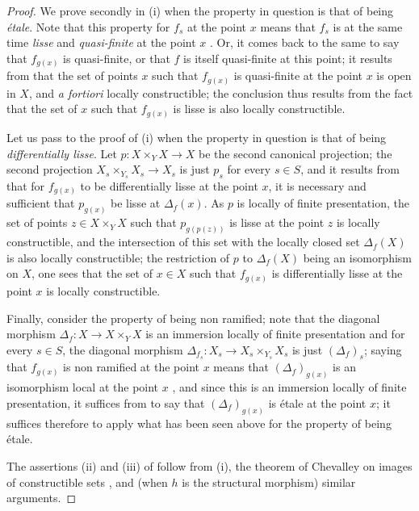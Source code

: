 \begin{proof}

We prove secondly in (i) when the property in question is that of being \emph{\'etale}.
Note that this property for $f_s$ at the point $x$ means that $f_s$ is at the same time \emph{lisse} and \emph{quasi-finite} at the point $x$ .
Or, it comes back to the same to say that $f_{g(x)}$ is quasi-finite, or that $f$ is itself quasi-finite at this point; it results from  that the set of points $x$ such that $f_{g(x)}$ is quasi-finite at the point $x$ is open in $X$, and \emph{a fortiori} locally constructible; the conclusion thus results from the fact that the set of $x$ such that $f_{g(x)}$ is lisse is also locally constructible.

Let us pass to the proof of (i) when the property in question is that of being \emph{differentially lisse}.
Let $p:X\times_Y X\to X$ be the second canonical projection; the second projection $X_s\times_{Y_s}X_s\to X_s$ is just $p_s$ for every $s\in S$, and it results from  that for $f_{g(x)}$ to be differentially lisse at the point $x$, it is necessary and sufficient that $p_{g(x)}$ be lisse at $\Delta_f(x)$.
As $p$ is locally of finite presentation, the set of points $z\in X\times_Y X$ such that $p_{g(p(z))}$ is lisse at the point $z$ is locally constructible, and the intersection of this set with the locally closed set $\Delta_f(X)$ is also locally constructible; the restriction of $p$ to $\Delta_f(X)$ being an isomorphism on $X$, one sees that the set of $x\in X$ such that $f_{g(x)}$ is differentially lisse at the point $x$ is locally constructible.

Finally, consider the property of being non ramified; note that the diagonal morphism $\Delta_f:X\to X\times_Y X$ is an immersion locally of finite presentation  and for every $s\in S$, the diagonal morphism $\Delta_{f_s}:X_s\to X_s\times_{Y_s}X_s$ is just $(\Delta_f)_s$; saying that $f_{g(x)}$ is non ramified at the point $x$ means that $(\Delta_f)_{g(x)}$ is an isomorphism local at the point $x$ , and since this is an immersion locally of finite presentation, it suffices from  to say that $(\Delta_f)_{g(x)}$ is \'etale at the point $x$; it suffices therefore to apply what has been seen above for the property of being \'etale.

The assertions (ii) and (iii) of  follow from (i), the theorem of Chevalley on images of constructible sets , and (when $h$ is the structural morphism) similar arguments.
\end{proof}


